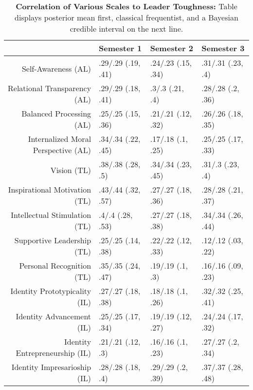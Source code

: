 \begin{table}[ht]
\centering
\begin{tabular}{rlll}
  \hline
 & Semester 1 & Semester 2 & Semester 3 \\ 
  \hline
Self-Awareness (AL) & .29/.29 (.19, .41) & .24/.23 (.15, .34) & .31/.31 (.23, .4) \\ 
  Relational Transparency (AL) & .29/.29 (.18, .41) & .3/.3 (.21, .4) & .28/.28 (.2, .36) \\ 
  Balanced Processing (AL) & .25/.25 (.15, .36) & .21/.21 (.12, .32) & .26/.26 (.18, .35) \\ 
  Internalized Moral Perspective (AL) & .34/.34 (.22, .45) & .17/.18 (.1, .25) & .25/.25 (.17, .33) \\ 
  Vision (TL) & .38/.38 (.28, .5) & .34/.34 (.23, .45) & .31/.3 (.23, .4) \\ 
  Inspirational Motivation (TL) & .43/.44 (.32, .57) & .27/.27 (.18, .36) & .28/.28 (.21, .37) \\ 
  Intellectual Stimulation (TL) & .4/.4 (.28, .53) & .27/.27 (.18, .38) & .34/.34 (.26, .44) \\ 
  Supportive Leadership (TL) & .25/.25 (.14, .38) & .22/.22 (.12, .33) & .12/.12 (.03, .22) \\ 
  Personal Recognition (TL) & .35/.35 (.24, .47) & .19/.19 (.1, .3) & .16/.16 (.09, .23) \\ 
  Identity Prototypicality (IL) & .27/.27 (.18, .38) & .18/.18 (.1, .26) & .32/.32 (.25, .41) \\ 
  Identity Advancement (IL) & .25/.25 (.17, .34) & .19/.19 (.12, .27) & .24/.24 (.17, .32) \\ 
  Identity Entrepreneurship (IL) & .21/.21 (.12, .3) & .16/.16 (.1, .23) & .27/.27 (.2, .34) \\ 
  Identity Impresarioship (IL) & .28/.28 (.18, .4) & .29/.29 (.2, .39) & .37/.37 (.28, .48) \\ 
   \hline
\end{tabular}
\caption{\textbf{Correlation of Various Scales to Leader Toughness:} Table displays posterior mean first, classical frequentist, and a Bayesian credible interval on the next line.} 
\label{tab:lead_corr}
\end{table}
